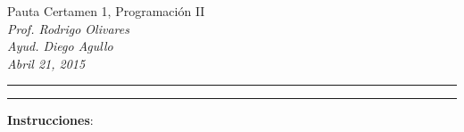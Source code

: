 \documentclass[10pt]{article}
\begin{document}
\begin{center}
    {\Large Pauta Certamen 1, Programaci\'on II} \\
    \emph{\small Prof. Rodrigo Olivares} \\
    \emph{\small Ayud. Diego Agullo} \\
    \emph{\scriptsize Abril 21, 2015}
\end{center}
\vspace*{-35pt}
\begin{center}
    \rule{1\textwidth}{.3pt}
\end{center}
\vspace*{-42pt}
\begin{center}
    \rule{1\textwidth}{2pt}
\end{center}

\vspace*{-15pt}
{\small \textbf{Instrucciones}:}
\vspace*{-15pt}
\end{document}
